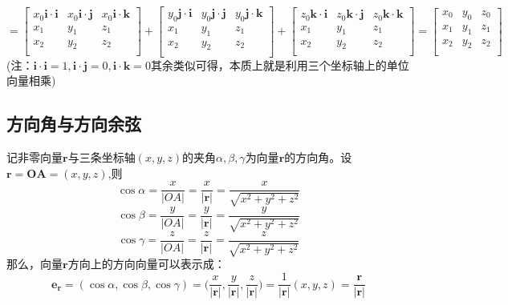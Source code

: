 \begin{equation}
	\nonumber
	=\begin{bmatrix}
		x_0\boldsymbol{i}\cdot\boldsymbol{i} & x_0\boldsymbol{i}\cdot\boldsymbol{j} & x_0\boldsymbol{i}\cdot\boldsymbol{k}\\
	x_1 & y_1 & z_1\\
	x_2 & y_2 & z_2\\
	\end{bmatrix}+
\begin{bmatrix}
	y_0\boldsymbol{j}\cdot\boldsymbol{i} & y_0\boldsymbol{j}\cdot\boldsymbol{j} & y_0\boldsymbol{j}\cdot\boldsymbol{k}\\
	x_1 & y_1 & z_1\\
	x_2 & y_2 & z_2\\
\end{bmatrix}+
\begin{bmatrix}
	z_0\boldsymbol{k}\cdot\boldsymbol{i} & z_0\boldsymbol{k}\cdot\boldsymbol{j} & z_0\boldsymbol{k}\cdot\boldsymbol{k}\\
	x_1 & y_1 & z_1\\
	x_2 & y_2 & z_2\\
\end{bmatrix}=
\begin{bmatrix}
	x_0 & y_0 & z_0\\
	x_1 & y_1 & z_1\\
	x_2 & y_2 & z_2\\
\end{bmatrix}
\end{equation}
(注：$\boldsymbol{i}\cdot\boldsymbol{i}=1,\boldsymbol{i}\cdot\boldsymbol{j}=0,\boldsymbol{i}\cdot\boldsymbol{k}=0$其余类似可得，本质上就是利用三个坐标轴上的单位向量相乘)
\subsection{方向角与方向余弦}
记非零向量$\boldsymbol{r}$与三条坐标轴$(x,y,z)$的夹角$\alpha,\beta,\gamma$为向量$\boldsymbol{r}$的方向角。设$\boldsymbol{r}=\boldsymbol{OA}=(x,y,z)$,则
\begin{equation}
	\cos \alpha=\frac{x}{|OA|}=\frac{x}{\boldsymbol{|r|}}=\frac{x}{\sqrt{x^2+y^2+z^2}}
\end{equation}
\begin{equation}
	\cos \beta=\frac{y}{|OA|}=\frac{y}{\boldsymbol{|r|}}=\frac{y}{\sqrt{x^2+y^2+z^2}}
\end{equation}
\begin{equation}
	\cos \gamma=\frac{z}{|OA|}=\frac{z}{\boldsymbol{|r|}}=\frac{z}{\sqrt{x^2+y^2+z^2}}
\end{equation}
那么，向量$\boldsymbol{r}$方向上的方向向量可以表示成：
\begin{equation}
	\boldsymbol{e_r}=(\cos \alpha,\cos \beta,\cos \gamma)=\bigg(\frac{x}{|\boldsymbol{r}|},\frac{y}{|\boldsymbol{r}|},\frac{z}{|\boldsymbol{r}|}\bigg)=\frac{1}{|\boldsymbol{r}|}(x,y,z)=\frac{\boldsymbol{r}}{|\boldsymbol{r}|}
\end{equation}
